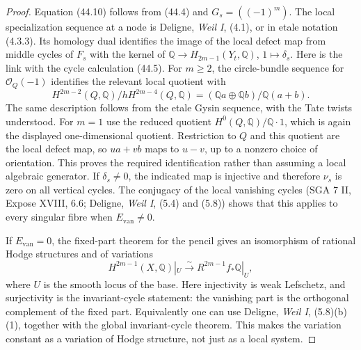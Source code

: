 \documentclass[11pt,a4paper]{article}
\theoremstyle{definition}
\theoremstyle{remark}
\begin{document}
\begin{proof}
Equation (44.10) follows from (44.4) and $G_s=((-1)^m)$.
The local specialization sequence at a node is Deligne, \emph{Weil I},
(4.1), or in etale notation (4.3.3).  Its homology dual identifies
the image of the local defect map from middle cycles of $F_s$ with
the kernel of
$\mathbb Q\longrightarrow H_{2m-1}(Y_t,\mathbb Q)$,
$1\mapsto\delta_s$.  Here is the link with the cycle calculation
(44.5).  For $m\ge2$, the circle-bundle sequence for
$\mathcal O_Q(-1)$ identifies the relevant local quotient with
\[
 H^{2m-2}(Q,\mathbb Q)\big/
       hH^{2m-4}(Q,\mathbb Q)
   = (\mathbb Q a\oplus\mathbb Q b)/\mathbb Q(a+b).
\]
The same description follows from the etale Gysin sequence, with
the Tate twists understood.  For $m=1$ use the reduced quotient
$H^0(Q,\mathbb Q)/\mathbb Q\cdot1$, which is again the displayed
one-dimensional quotient.  Restriction to $Q$ and this quotient
are the local defect map, so $ua+vb$ maps to $u-v$, up to a
nonzero choice of orientation.  This proves the required
identification rather than assuming a local algebraic generator.
If
$\delta_s\ne0$, the indicated map is injective and therefore
$\nu_s$ is zero on all vertical cycles.  The conjugacy of the local
vanishing cycles (SGA 7 II, Expose XVIII, 6.6; Deligne, \emph{Weil I},
(5.4) and (5.8)) shows that this applies to every singular fibre
when $E_{\mathrm{van}}\ne0$.

If $E_{\mathrm{van}}=0$, the fixed-part theorem for the pencil gives
an isomorphism of rational Hodge structures and of variations
\[
 H^{2m-1}(X,\mathbb Q)|_U\xrightarrow{\sim}
 R^{2m-1}f_*\mathbb Q|_U,
\]
where $U$ is the smooth locus of the base.  Here injectivity is weak
Lefschetz, and surjectivity is the invariant-cycle statement:
the vanishing part is the orthogonal complement of the fixed part.
Equivalently one can use Deligne, \emph{Weil I}, (5.8)(b)(1), together
with the global invariant-cycle theorem.  This makes the variation
constant as a variation of Hodge structure, not just as a local
system.


\end{proof}
\end{document}
